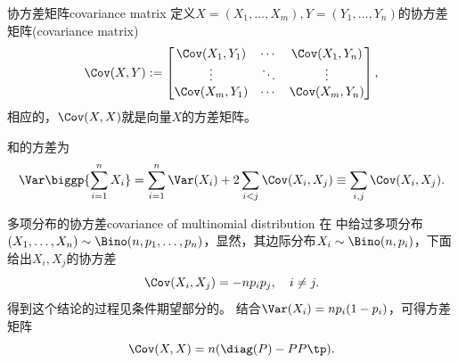 \begin{definition}{协方差矩阵}{covariance matrix}
	定义$X=(X_1,\ldots,X_m),Y=(Y_1,\ldots,Y_n)$的协方差矩阵(covariance matrix)
	\begin{equation}
		\Cov(X,Y):=\begin{bmatrix}
			\Cov(X_1,Y_1)&\cdots&\Cov(X_1,Y_n)\\
			\vdots&\ddots&\vdots\\
			\Cov(X_m,Y_1)&\cdots&\Cov(X_m,Y_n)
		\end{bmatrix},
	\end{equation}
	相应的，$\Cov(X,X)$就是向量$X$的方差矩阵。
\end{definition}
\begin{corollary}
	和的方差为
	\begin{equation}
		\Var\biggp{\sum_{i=1}^nX_i}=\sum_{i=1}^n\Var(X_i)+2\sum_{i<j}\Cov(X_i,X_j)\equiv\sum_{i,j}\Cov(X_i,X_j).
	\end{equation}
\end{corollary}
\begin{example}{多项分布的协方差}{covariance of multinomial distribution}
	在 中给过多项分布$(X_1,\ldots,X_n)\sim\Bino(n,p_1,\ldots,p_n)$，显然，其边际分布$X_i\sim\Bino(n,p_i)$，下面给出$X_i,X_j$的协方差
	\begin{equation}
		\Cov(X_i,X_j)=-np_ip_j,\quad i\neq j.
	\end{equation}
	得到这个结论的过程见条件期望部分的。
	结合$\Var(X_i)=np_i(1-p_i)$，可得方差矩阵
	\begin{equation}
		\Cov(X,X)=n(\diag(P)-PP\tp).
	\end{equation}
\end{example}
